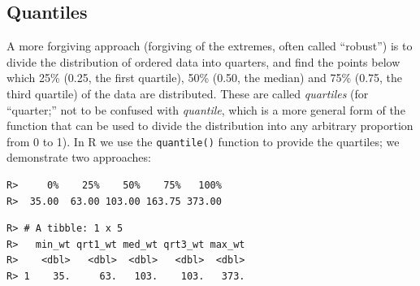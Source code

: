 \documentclass[english,10pt,a4paper,oneside]{book}
\newenvironment{Shaded}{\begin{snugshade}}{\end{snugshade}}
\newcommand{\KeywordTok}[1]{\textcolor[rgb]{0.13,0.29,0.53}{\textbf{#1}}}
\newcommand{\DataTypeTok}[1]{\textcolor[rgb]{0.13,0.29,0.53}{#1}}
\newcommand{\FloatTok}[1]{\textcolor[rgb]{0.00,0.00,0.81}{#1}}
\newcommand{\StringTok}[1]{\textcolor[rgb]{0.31,0.60,0.02}{#1}}
\newcommand{\OperatorTok}[1]{\textcolor[rgb]{0.81,0.36,0.00}{\textbf{#1}}}
\newcommand{\NormalTok}[1]{#1}
\theoremstyle{definition}
\theoremstyle{definition}
\theoremstyle{definition}
\theoremstyle{remark}
\begin{document}
\subsection{Quantiles}\label{quantiles}

A more forgiving approach (forgiving of the extremes, often called
\enquote{robust}) is to divide the distribution of ordered data into
quarters, and find the points below which 25\% (0.25, the first
quartile), 50\% (0.50, the median) and 75\% (0.75, the third quartile)
of the data are distributed. These are called \emph{quartiles} (for
\enquote{quarter;} not to be confused with \emph{quantile}, which is a
more general form of the function that can be used to divide the
distribution into any arbitrary proportion from 0 to 1). In R we use the
\texttt{quantile()} function to provide the quartiles; we demonstrate
two approaches:

\begin{Shaded}
\end{Shaded}

\begin{verbatim}
R>     0%    25%    50%    75%   100% 
R>  35.00  63.00 103.00 163.75 373.00
\end{verbatim}

\begin{Shaded}
\end{Shaded}

\begin{verbatim}
R> # A tibble: 1 x 5
R>   min_wt qrt1_wt med_wt qrt3_wt max_wt
R>    <dbl>   <dbl>  <dbl>   <dbl>  <dbl>
R> 1    35.     63.   103.    103.   373.
\end{verbatim}
\end{document}

